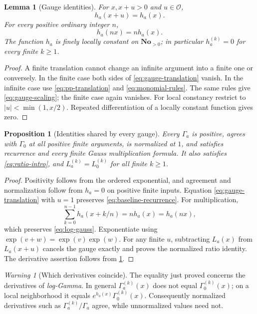 \documentclass[11pt,letterpaper]{article}
\numberwithin{equation}{section}
\theoremstyle{plain}
\newtheorem{lemma}[lemma]{Lemma}
\newtheorem{proposition}[proposition]{Proposition}
\theoremstyle{definition}
\theoremstyle{remark}
\newtheorem{warning}[warning]{Warning}
\newcommand{\No}{\mathbf{No}}
\newcommand{\Ocal}{\mathcal O}
\newcommand{\abs}[1]{\lvert#1\rvert}
\begin{document}
\begin{lemma}[Gauge identities]\label{lem:gauge-identities}
For $x,x+u>0$ and $u\in\Ocal$,
\begin{equation}\label{eq:gauge-translation}
 h_a(x+u)=h_a(x).
\end{equation}
For every positive ordinary integer $n$,
\begin{equation}\label{eq:gauge-scaling}
 h_a(nx)=n h_a(x).
\end{equation}
The function $h_a$ is finely locally constant on $\No_{>0}$; in particular
$h_a^{(k)}=0$ for every finite $k\ge1$.
\end{lemma}
\begin{proof}
A finite translation cannot change an infinite argument into a finite one or
conversely. In the finite case both sides of
\eqref{eq:gauge-translation} vanish. In the infinite case use
\eqref{eq:pp-translation} and \eqref{eq:monomial-rules}.
The same rules give \eqref{eq:gauge-scaling}; the finite case again vanishes.
For local constancy restrict to
$\abs u<\min(1,x/2)$. Repeated differentiation of a locally constant
function gives zero.
\end{proof}

\begin{proposition}[Identities shared by every gauge]\label{prop:gauge-invariance}
Every $\Gamma_a$ is positive, agrees with $\Gamma_0$ at all positive finite
arguments, is normalized at $1$, and satisfies recurrence
and every finite Gauss multiplication formula. It also satisfies
\eqref{eq:ratio-intro}, and $L_a^{(k)}=L_0^{(k)}$ for all finite $k\ge1$.
\end{proposition}
\begin{proof}
Positivity follows from the ordered exponential, and agreement and
normalization follow from $h_a=0$ on positive finite inputs.
Equation \eqref{eq:gauge-translation} with $u=1$ preserves
\eqref{eq:baseline-recurrence}. For multiplication,
\[
 \sum_{k=0}^{n-1}h_a(x+k/n)=n h_a(x)=h_a(nx),
\]
which preserves \eqref{eq:log-gauss}. Exponentiate using
$\exp(v+w)=\exp(v)\exp(w)$.
For any finite $u$, subtracting $L_a(x)$ from $L_a(x+u)$ cancels the
gauge exactly and proves the normalized ratio identity.
The derivative assertion follows from \cref{lem:gauge-identities}.
\end{proof}

\begin{warning}[Which derivatives coincide]
The equality just proved concerns the derivatives of \emph{log-Gamma}.
In general $\Gamma_a^{(k)}(x)$ does not equal $\Gamma_0^{(k)}(x)$;
on a local neighborhood it equals
$e^{h_a(x)}\Gamma_0^{(k)}(x)$. Consequently normalized derivatives such as
$\Gamma_a^{(k)}/\Gamma_a$ agree, while unnormalized values need not.
\end{warning}
\end{document}
